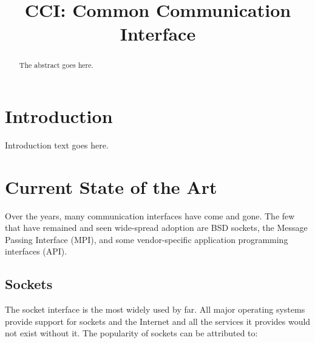 \documentclass[conference]{IEEEtran}
\begin{document}
%
\title{CCI: Common Communication Interface}
% 
\author{
}

\maketitle

\begin{abstract}
The abstract goes here.

\end{abstract}


\IEEEpeerreviewmaketitle

\newcommand{\note}[1]{\colorbox{yellow!50}{Note: #1}}

\newcommand{\f}[1]{\texttt{#1()}}

\section{Introduction}
Introduction text goes here.

\section{Current State of the Art}
Over the years, many communication interfaces have come and gone. The few that have
remained and seen wide-spread adoption are BSD sockets\cite{bsd}, the Message Passing
Interface (MPI)\cite{mpi}, and some vendor-specific application programming interfaces
(API).

\subsection{Sockets} The socket interface is the most widely used by far. All major
operating systems provide support for sockets and the Internet and all the services it
provides would not exist without it. The popularity of sockets can be attributed to:
\end{document}
